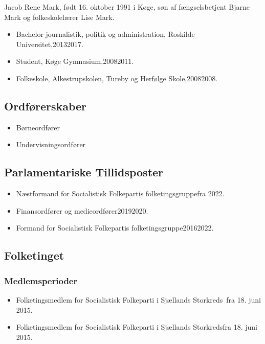 \documentclass[11pt, a4paper]{awesome-cv}
\begin{document}
\makecvheader[R]
\makelettertitle
\begin{cvletter}
Jacob Rene Mark, født 16. oktober 1991 i Køge, søn af fængselsbetjent Bjarne Mark og folkeskolelærer Lise Mark.

\begin{itemize}
\item Bachelor journalistik, politik og administration, Roskilde Universitet,20132017.
\item Student, Køge Gymnasium,20082011.
\item Folkeskole, Alkestrupskolen, Tureby og Herfølge Skole,20082008.
\end{itemize}
\subsection*{Ordførerskaber}
\begin{itemize}
\item Børneordfører
\item Undervisningsordfører
\end{itemize}
\subsection*{Parlamentariske Tillidsposter}
\begin{itemize}
\item Næstformand for Socialistisk Folkepartis folketingsgruppefra 2022.
\item Finansordfører og medieordfører20192020.
\item Formand for Socialistisk Folkepartis folketingsgruppe20162022.
\end{itemize}
\subsection*{Folketinget}
\subsubsection*{Medlemsperioder}
\begin{itemize}
\item Folketingsmedlem for Socialistisk Folkeparti i Sjællands Storkreds fra 18. juni 2015.
\item Folketingsmedlem for Socialistisk Folkeparti i Sjællands Storkredsfra 18. juni 2015.
\end{itemize}

\end{cvletter}
\end{document}
